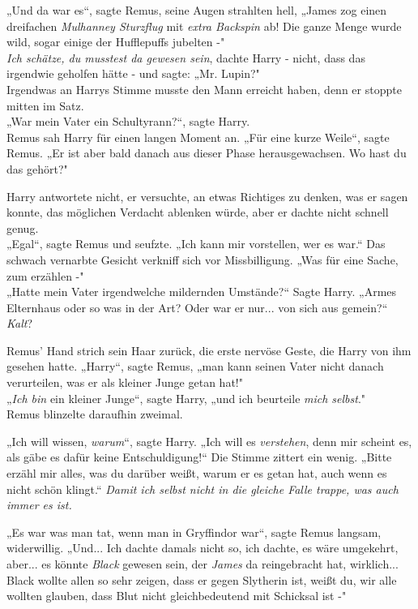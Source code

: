 {„Und da war es“, sagte Remus, seine Augen strahlten hell, „James zog einen dreifachen \emph{Mulhanney Sturzflug} mit \emph{extra Backspin} ab! Die ganze Menge wurde wild, sogar einige der Hufflepuffs jubelten -"\\ \emph{Ich schätze, du musstest da gewesen sein}, dachte Harry - nicht, dass das irgendwie geholfen hätte - und sagte: „Mr. Lupin?"\\ Irgendwas an Harrys Stimme musste den Mann erreicht haben, denn er stoppte mitten im Satz.\\ „War mein Vater ein Schultyrann?“, sagte Harry.\\ Remus sah Harry für einen langen Moment an. „Für eine kurze Weile“, sagte Remus. „Er ist aber bald danach aus dieser Phase herausgewachsen. Wo hast du das gehört?"

Harry antwortete nicht, er versuchte, an etwas Richtiges zu denken, was er sagen konnte, das möglichen Verdacht ablenken würde, aber er dachte nicht schnell genug.\\ „Egal“, sagte Remus und seufzte. „Ich kann mir vorstellen, wer es war.“ Das schwach vernarbte Gesicht verkniff sich vor Missbilligung. „Was für eine Sache, zum erzählen -"\\ „Hatte mein Vater irgendwelche mildernden Umstände?“ Sagte Harry. „Armes Elternhaus oder so was in der Art? Oder war er nur... von sich aus gemein?“ \emph{Kalt}?

Remus' Hand strich sein Haar zurück, die erste nervöse Geste, die Harry von ihm gesehen hatte. „Harry“, sagte Remus, „man kann seinen Vater nicht danach verurteilen, was er als kleiner Junge getan hat!"\\ „\emph{Ich bin} ein kleiner Junge“, sagte Harry, „und ich beurteile \emph{mich selbst}."\\ Remus blinzelte daraufhin zweimal.

„Ich will wissen, \emph{warum}“, sagte Harry. „Ich will es \emph{verstehen}, denn mir scheint es, als gäbe es dafür keine Entschuldigung!“ Die Stimme zittert ein wenig. „Bitte erzähl mir alles, was du darüber weißt, warum er es getan hat, auch wenn es nicht schön klingt.“ \emph{Damit ich selbst nicht in die gleiche Falle trappe, was auch immer es ist.}

„Es war was man tat, wenn man in Gryffindor war“, sagte Remus langsam, widerwillig. „Und... Ich dachte damals nicht so, ich dachte, es wäre umgekehrt, aber... es könnte \emph{Black} gewesen sein, der \emph{James} da reingebracht hat, wirklich... Black wollte allen so sehr zeigen, dass er gegen Slytherin ist, weißt du, wir alle wollten glauben, dass Blut nicht gleichbedeutend mit Schicksal ist -"

}

